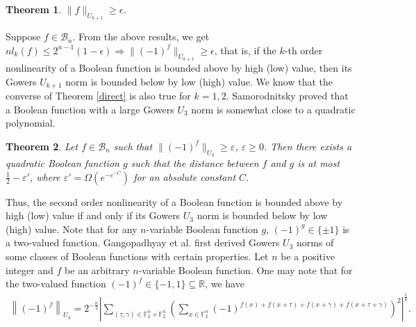 \documentclass[12 pt]{article}
\newtheorem{theorem}{Theorem}
\def\F{{\mathbb F}}
\begin{document}
{\begin{theorem}
$\| f \|_{U_{k+1}} \ge \epsilon$.
\end{theorem}
Suppose $f\in\mathcal B_n$. From the above results, we get $nl_k(f) \leq 2^{n-1}(1-\epsilon) \Rightarrow \|(-1)^f\|_{U_{k+1}} \geq \epsilon$, that is, if the $k$-th order nonlinearity of
a Boolean function is bounded above by high (low) value, then its Gowers $U_{k+1}$ norm is bounded below by low (high) value. We know \cite{GT06,SamSTOCy07} that the converse of
Theorem \ref{direct} is also true for $k=1, 2$. Samorodnitsky \cite{SamSTOCy07} proved that a Boolean function with a large Gowers $U_3$ norm is somewhat close to a quadratic polynomial.
\begin{theorem}\cite[Theorem 2.3]{SamSTOCy07}
\label{inverse-2nd}
Let $f\in\mathcal B_n$ such that $\|(-1)^f\|_{U_3}\geq \varepsilon$, $\varepsilon\geq 0$. Then there exists a quadratic Boolean function $g$ such that the distance between $f$ and $g$ is at most $\frac{1}{2}-\varepsilon'$, where $\varepsilon'=\Omega(e^{-{\varepsilon^{-C}}})$ for an absolute  constant $C$.
\end{theorem}
Thus, the second order nonlinearity of a Boolean function is bounded above by high (low) value if and only if its Gowers $U_{3}$ norm is bounded below by low (high) value. Note that for any
$n$-variable Boolean function $g$, $(-1)^{g}\in\{\pm1\}$ is a  two-valued function. Gangopadhyay et al. \cite{GMS18} first derived Gowers $U_3$ norms of some classes of Boolean
functions with certain properties. Let $n$ be a positive integer and $f$ be an arbitrary $n$-variable Boolean function. One may note that for the two-valued function
$(-1)^f\in\{-1,1\}\subseteq \mathbb{R}$,
we have
\begin{eqnarray}\label{L:U3}
\left\| (-1)^{f} \right\| _{U_3}=2^{-{\frac n2}}\left|\sum_{(\tau,\gamma)\in\F_2^n\times \F_2^n}\left(\sum_{x\in\F_2^n}(-1)^{f(x)+f(x+\tau)+f(x+\gamma)+f(x+\tau+\gamma)}\right)^2\right|^{\frac 18}.
\end{eqnarray}

}
\end{document}
